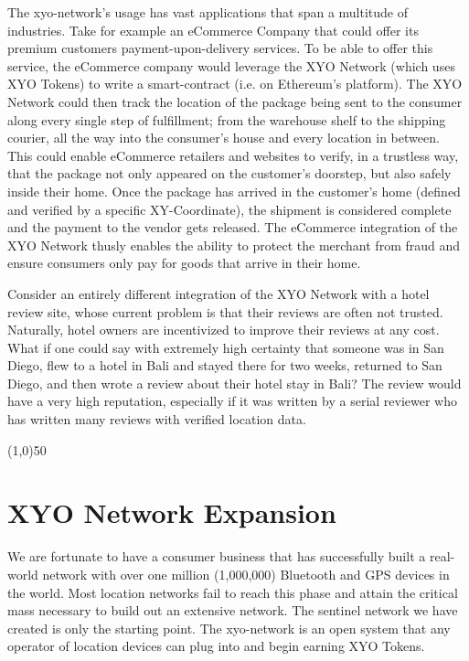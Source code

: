 \documentclass{article}
\begin{document}
The \Gls{xyo-network}'s usage has vast applications that span a multitude of industries. Take for example an eCommerce Company that could offer its premium customers payment-upon-delivery services. To be able to offer this service, the eCommerce company would leverage the XYO Network (which uses XYO Tokens) to write a \gls{smart-contract} (i.e. on Ethereum's platform). The XYO Network could then track the location of the package being sent to the consumer along every single step of fulfillment; from the warehouse shelf to the shipping courier, all the way into the consumer's house and every location in between. This could enable eCommerce retailers and websites to verify, in a \gls{trustless} way, that the package not only appeared on the customer's doorstep, but also safely inside their home. Once the package has arrived in the customer's home (defined and verified by a specific XY-Coordinate), the shipment is considered complete and the payment to the vendor gets released. The eCommerce integration of the XYO Network thusly enables the ability to protect the merchant from fraud and ensure consumers only pay for goods that arrive in their home.

Consider an entirely different integration of the XYO Network with a hotel review site, whose current problem is that their reviews are often not trusted. Naturally, hotel owners are incentivized to improve their reviews at any cost. What if one could say with extremely high \gls{certainty} that someone was in San Diego, flew to a hotel in Bali and stayed there for two weeks, returned to San Diego, and then wrote a review about their hotel stay in Bali? The review would have a very high reputation, especially if it was written by a serial reviewer who has written many reviews with verified location data.

\begin{center}
\line(1,0){50}
\end{center}

\section {XYO Network Expansion}
We are fortunate to have a consumer business that has successfully built a real-world network with over one million (1,000,000) Bluetooth and GPS devices in the world. Most location networks fail to reach this phase and attain the critical mass necessary to build out an extensive network. The \Gls{sentinel} network we have created is only the starting point. The \Gls{xyo-network} is an open system that any operator of location devices can plug into and begin earning XYO Tokens.
\end{document}
